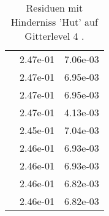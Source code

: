 \begin{table}
\begin{tabular}{c|cc|}
\multicolumn{1}{|c|}{} & \multicolumn{1}{|c|}{  2.47e-01} & \multicolumn{1}{|c|}{  7.06e-03} \\ 
\multicolumn{1}{|c|}{} & \multicolumn{1}{|c|}{  2.47e-01} & \multicolumn{1}{|c|}{  6.95e-03} \\ 
\multicolumn{1}{|c|}{} & \multicolumn{1}{|c|}{  2.47e-01} & \multicolumn{1}{|c|}{  6.95e-03} \\ 
\multicolumn{1}{|c|}{} & \multicolumn{1}{|c|}{  2.47e-01} & \multicolumn{1}{|c|}{  4.13e-03} \\ 
\multicolumn{1}{|c|}{} & \multicolumn{1}{|c|}{  2.45e-01} & \multicolumn{1}{|c|}{  7.04e-03} \\ 
\multicolumn{1}{|c|}{} & \multicolumn{1}{|c|}{  2.46e-01} & \multicolumn{1}{|c|}{  6.93e-03} \\ 
\multicolumn{1}{|c|}{} & \multicolumn{1}{|c|}{  2.46e-01} & \multicolumn{1}{|c|}{  6.93e-03} \\ 
\multicolumn{1}{|c|}{} & \multicolumn{1}{|c|}{  2.46e-01} & \multicolumn{1}{|c|}{  6.82e-03} \\ 
\multicolumn{1}{|c|}{} & \multicolumn{1}{|c|}{  2.46e-01} & \multicolumn{1}{|c|}{  6.82e-03} \\ 
\hline 
\end{tabular}\caption{Residuen mit Hinderniss 'Hut' auf Gitterlevel 4 .}\label{tab:Residuum_Hut_level4}
\end{table} 

